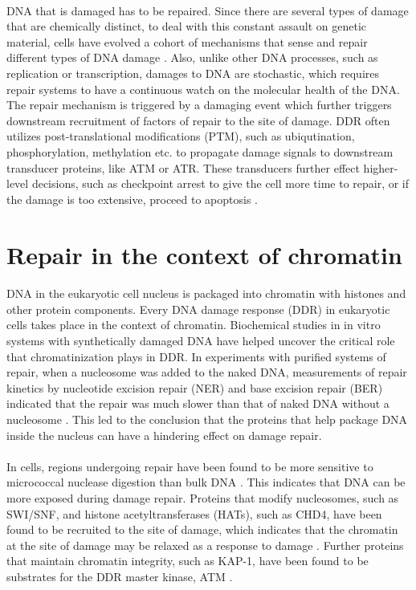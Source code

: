 \paragraph*{} DNA that is damaged has to be repaired. Since there are several types of damage that are chemically distinct, to deal with this constant assault on genetic material, cells have evolved a cohort of mechanisms that sense and repair different types of DNA damage \cite{hoeijmakers2009dna}. Also, unlike other DNA processes, such as replication or transcription, damages to DNA are stochastic, which requires repair systems to have a continuous watch on the molecular health of the DNA. The repair mechanism is triggered by a damaging event which further triggers downstream recruitment of factors of repair to the site of damage. DDR often utilizes post-translational modifications (PTM), such as ubiqutination, phosphorylation, methylation etc. to propagate damage signals to downstream transducer proteins, like ATM or ATR. These transducers further effect higher-level decisions, such as checkpoint arrest to give the cell more time to repair, or if the damage is too extensive, proceed to apoptosis \cite{derks2014dna}.

\section{Repair in the context of chromatin}
\paragraph*{} DNA in the eukaryotic cell nucleus is packaged into chromatin with histones and other protein components. Every DNA damage response (DDR) in eukaryotic cells takes place in the context of chromatin. Biochemical studies in in vitro systems with synthetically damaged DNA have helped uncover the critical role that chromatinization plays in DDR. In experiments with purified systems of repair, when a nucleosome was added to the naked DNA, measurements of repair kinetics by nucleotide excision repair (NER) and base excision repair (BER) indicated that the repair was much slower than that of naked DNA without a nucleosome \cite{hara2000dna,odell2011nucleosome}. This led to the conclusion that the proteins that help package DNA inside the nucleus can have a hindering effect on damage repair. 

\paragraph*{} In cells, regions undergoing repair have been found to be more sensitive to micrococcal nuclease digestion than bulk DNA \cite{smerdon1978distribution}. This indicates that DNA can be more exposed during damage repair. Proteins that modify nucleosomes, such as SWI/SNF, and histone acetyltransferases (HATs), such as CHD4, have been found to be recruited to the site of damage, which indicates that the chromatin at the site of damage may be relaxed as a response to damage \cite{park2006mammalian, polo2010regulation}. Further proteins that maintain chromatin integrity, such as KAP-1, have been found to be substrates for the DDR master kinase, ATM \cite{ziv2006chromatin}.

